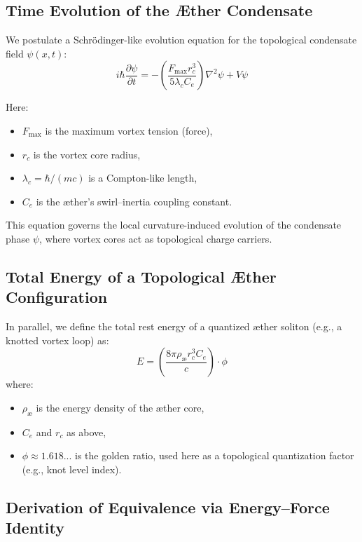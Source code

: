 \subsection{Time Evolution of the Æther Condensate}

We postulate a Schrödinger-like evolution equation for the topological condensate field $\psi(x,t)$:
\begin{equation}
i\hbar \frac{\partial \psi}{\partial t} = - \left( \frac{F_{\max} r_c^3}{5 \lambda_c C_e} \right) \nabla^2 \psi + V \psi
\end{equation}

Here:
\begin{itemize}
  \item $F_{\max}$ is the maximum vortex tension (force),
  \item $r_c$ is the vortex core radius,
  \item $\lambda_c = \hbar / (m c)$ is a Compton-like length,
  \item $C_e$ is the æther’s swirl–inertia coupling constant.
\end{itemize}

This equation governs the local curvature-induced evolution of the condensate phase $\psi$, where vortex cores act as topological charge carriers.

\subsection{Total Energy of a Topological Æther Configuration}

In parallel, we define the total rest energy of a quantized æther soliton (e.g., a knotted vortex loop) as:
\begin{equation}
E = \left( \frac{8\pi \rho_{\text{æ}} r_c^3 C_e}{c} \right) \cdot \phi
\end{equation}
where:
\begin{itemize}
  \item $\rho_{\text{æ}}$ is the energy density of the æther core,
  \item $C_e$ and $r_c$ as above,
  \item $\phi \approx 1.618...$ is the golden ratio, used here as a topological quantization factor (e.g., knot level index).
\end{itemize}

\subsection{Derivation of Equivalence via Energy–Force Identity}

